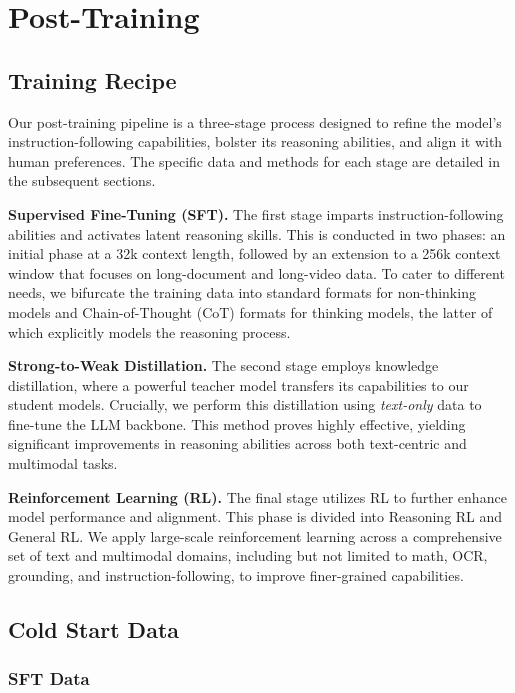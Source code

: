 \documentclass{article} %
\begin{document}
\section{Post-Training}

\subsection{Training Recipe}

Our post-training pipeline is a three-stage process designed to refine the model's instruction-following capabilities, bolster its reasoning abilities, and align it with human preferences. The specific data and methods for each stage are detailed in the subsequent sections.

\textbf{Supervised Fine-Tuning (SFT).} The first stage imparts instruction-following abilities and activates latent reasoning skills. This is conducted in two phases: an initial phase at a 32k context length, followed by an extension to a 256k context window that focuses on long-document and long-video data. To cater to different needs, we bifurcate the training data into standard formats for non-thinking models and Chain-of-Thought (CoT) formats for thinking models, the latter of which explicitly models the reasoning process.

\textbf{Strong-to-Weak Distillation.} The second stage employs knowledge distillation, where a powerful teacher model transfers its capabilities to our student models. Crucially, we perform this distillation using \textit{text-only} data to fine-tune the LLM backbone. This method proves highly effective, yielding significant improvements in reasoning abilities across both text-centric and multimodal tasks.

\textbf{Reinforcement Learning (RL).} The final stage utilizes RL to further enhance model performance and alignment. This phase is divided into Reasoning RL and General RL. We apply large-scale reinforcement learning across a comprehensive set of text and multimodal domains, including but not limited to math, OCR, grounding, and instruction-following, to improve finer-grained capabilities.

\subsection{Cold Start Data}
\subsubsection{SFT Data}
\end{document}
